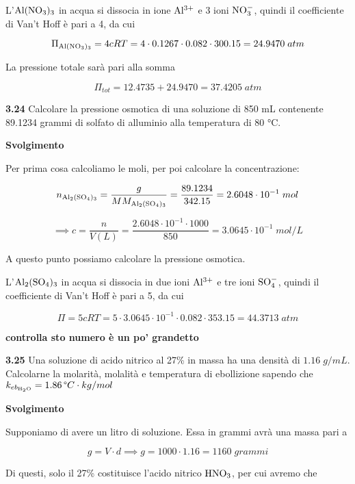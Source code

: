 L'$\rm Al(NO_3)_3$ in acqua si dissocia in ione $\rm Al^{3+}$ e 3 ioni $\rm NO_3^-$, quindi il coefficiente di Van't Hoff è pari a 4, da cui

$$\Pi_{\rm Al(NO_3)_3}=4cRT=4 \cdot 0.1267 \cdot 0.082 \cdot 300.15=24.9470\;atm$$

La pressione totale sarà pari alla somma

$$\Pi_{tot}=12.4735 + 24.9470=37.4205\;atm$$

\vspace{0.2cm}\textbf{3.24} Calcolare la pressione osmotica di una soluzione di 850 mL contenente 89.1234 grammi di solfato di alluminio alla temperatura di 80 °C.

\vspace{0.2cm}\large\textbf{Svolgimento}\normalsize

\vspace{0.2cm}Per prima cosa calcoliamo le moli, per poi calcolare la concentrazione:

$$n_{\rm Al_2(SO_4)_3}=\frac{g}{MM_{\rm Al_2(SO_4)_3}}=\frac{89.1234}{342.15}=2.6048 \cdot 10^{-1}\;mol$$

$$\implies c=\frac{n}{V(L)}=\frac{2.6048 \cdot 10^{-1} \cdot 1000}{850}=3.0645 \cdot 10^{-1}\;mol/L$$

A questo punto possiamo calcolare la pressione osmotica.

L'$\rm Al_2(SO_4)_3$ in acqua si dissocia in due ioni $\rm Al^{3+}$ e tre ioni $\rm SO_4^-$, quindi il coefficiente di Van't Hoff è pari a 5, da cui

$$\Pi=5cRT
=5 \cdot 3.0645 \cdot 10^{-1} \cdot 0.082 \cdot 353.15
=44.3713\;atm$$

\textbf{controlla sto numero è un po' grandetto}

\vspace{0.2cm}\textbf{3.25} Una soluzione di acido nitrico al 27\% in massa ha una densità di $1.16\;g/mL$. Calcolarne la molarità, molalità e temperatura di ebollizione sapendo che $k_{eb_{\rm H_2O}}=1.86\,\text{°}C \cdot kg/mol$

\vspace{0.2cm}\large\textbf{Svolgimento}\normalsize

\vspace{0.2cm}Supponiamo di avere un litro di soluzione. Essa in grammi avrà una massa pari a

$$g=V \cdot d \implies g=1000 \cdot 1.16 = 1160\;grammi$$

Di questi, solo il 27\% costituisce l'acido nitrico $\rm HNO_3$, per cui avremo che


